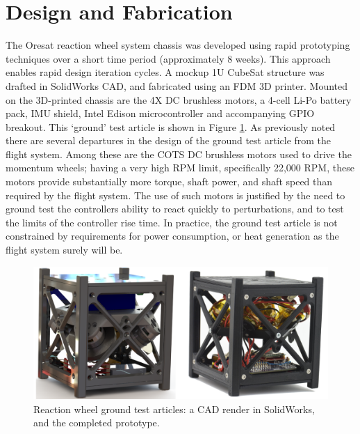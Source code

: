 \documentclass[]{aiaa-tc}%
\begin{document}
\section{Design and Fabrication}
	The Oresat reaction wheel system chassis was developed using rapid prototyping techniques over a short time period (approximately 8 weeks). This approach enables rapid design iteration cycles. A mockup 1U CubeSat structure was drafted in SolidWorks CAD, and fabricated using an FDM 3D printer. Mounted on the 3D-printed chassis are the 4X DC brushless motors, a 4-cell Li-Po battery pack, IMU shield, Intel Edison microcontroller and accompanying GPIO breakout. This `ground' test article is shown in Figure \ref{fig:rcs}. As previously noted there are several departures in the design of the ground test article from the flight system. Among these are the COTS DC brushless motors used to drive the momentum wheels; having a very high RPM limit, specifically 22,000 RPM, these motors provide substantially more torque, shaft power, and shaft speed than required by the flight system. The use of such motors is justified by the need to ground test the controllers ability to react quickly to perturbations, and to test the limits of the controller rise time. In practice, the ground test article is not constrained by requirements for power consumption, or heat generation as the flight system surely will be. 

\begin{figure}[h!]
  \centering
  \includegraphics[width=0.7\linewidth]{20160224_195322.png}
  \caption{Reaction wheel ground test articles: a CAD render in SolidWorks, and the completed prototype.}
  \label{fig:rcs}
\end{figure}
\end{document}
